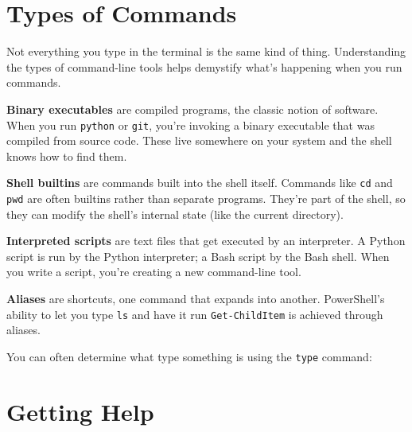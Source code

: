 \documentclass[
  letterpaper,
  DIV=11,
  numbers=noendperiod]{scrreprt}
\newenvironment{Shaded}{\begin{snugshade}}{\end{snugshade}}
\newcommand{\BuiltInTok}[1]{\textcolor[rgb]{0.00,0.23,0.31}{#1}}
\newcommand{\ExtensionTok}[1]{\textcolor[rgb]{0.00,0.23,0.31}{#1}}
\newcommand{\NormalTok}[1]{\textcolor[rgb]{0.00,0.23,0.31}{#1}}
\begin{document}
\section{Types of Commands}\label{types-of-commands}

Not everything you type in the terminal is the same kind of thing.
Understanding the types of command-line tools helps demystify what's
happening when you run commands.

\textbf{Binary executables} are compiled programs, the classic notion of
software. When you run \texttt{python} or \texttt{git}, you're invoking
a binary executable that was compiled from source code. These live
somewhere on your system and the shell knows how to find them.

\textbf{Shell builtins} are commands built into the shell itself.
Commands like \texttt{cd} and \texttt{pwd} are often builtins rather
than separate programs. They're part of the shell, so they can modify
the shell's internal state (like the current directory).

\textbf{Interpreted scripts} are text files that get executed by an
interpreter. A Python script is run by the Python interpreter; a Bash
script by the Bash shell. When you write a script, you're creating a new
command-line tool.

\textbf{Aliases} are shortcuts, one command that expands into another.
PowerShell's ability to let you type \texttt{ls} and have it run
\texttt{Get-ChildItem} is achieved through aliases.

You can often determine what type something is using the \texttt{type}
command:

\begin{codelisting}

\caption{\texttt{terminal}}

\begin{Shaded}
\end{Shaded}

\end{codelisting}

\section{Getting Help}\label{getting-help-1}
\end{document}
